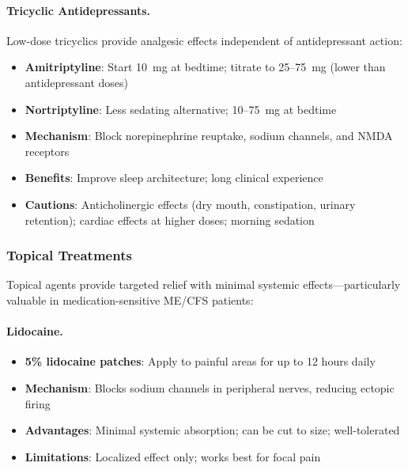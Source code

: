 \paragraph{Tricyclic Antidepressants.}
Low-dose tricyclics provide analgesic effects independent of antidepressant action:

\begin{itemize}
    \item \textbf{Amitriptyline}: Start 10~mg at bedtime; titrate to 25--75~mg (lower than antidepressant doses)
    \item \textbf{Nortriptyline}: Less sedating alternative; 10--75~mg at bedtime
    \item \textbf{Mechanism}: Block norepinephrine reuptake, sodium channels, and NMDA receptors
    \item \textbf{Benefits}: Improve sleep architecture; long clinical experience
    \item \textbf{Cautions}: Anticholinergic effects (dry mouth, constipation, urinary retention); cardiac effects at higher doses; morning sedation
\end{itemize}

\subsubsection{Topical Treatments}

Topical agents provide targeted relief with minimal systemic effects---particularly valuable in medication-sensitive ME/CFS patients:

\paragraph{Lidocaine.}
\begin{itemize}
    \item \textbf{5\% lidocaine patches}: Apply to painful areas for up to 12 hours daily
    \item \textbf{Mechanism}: Blocks sodium channels in peripheral nerves, reducing ectopic firing
    \item \textbf{Advantages}: Minimal systemic absorption; can be cut to size; well-tolerated
    \item \textbf{Limitations}: Localized effect only; works best for focal pain
\end{itemize}

